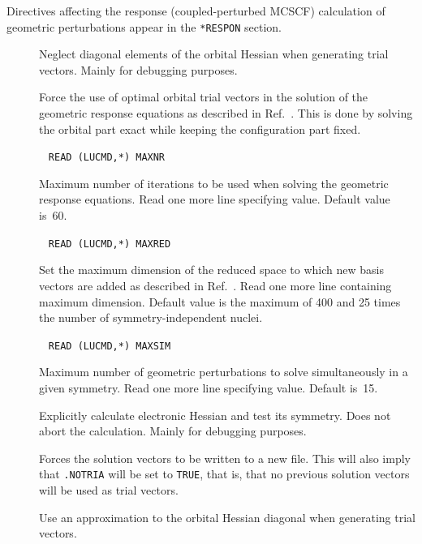 Directives affecting the response (coupled-perturbed MCSCF)
calculation  of geometric perturbations appear in the \verb|*RESPON|
section. 
\begin{description}
\item[] Neglect diagonal elements of the orbital
Hessian when generating trial vectors. Mainly for debugging
purposes. 

\item[] Force the use of optimal orbital
trial vectors in 
the solution of the geometric response equations as described in
Ref.~\cite{tuhjahjajpjjcp84}. This is done by solving the orbital part
exact while keeping the configuration part fixed.

\item[]\verb| |\newline
\verb|READ (LUCMD,*) MAXNR|

Maximum number of iterations to be used when solving the geometric
response equations.  Read one more line specifying value.
Default value is~60.

\item[]\verb| |\newline
\verb|READ (LUCMD,*) MAXRED|

Set the maximum dimension of the reduced space to which new basis
vectors are added as described in Ref.~\cite{tuhjahjajpjjcp84}. Read
one more line containing maximum dimension. Default value is the
maximum of 400 and 25 times the number of symmetry-independent nuclei.

\item[]\verb| |\newline
\verb|READ (LUCMD,*) MAXSIM|

Maximum number of geometric perturbations to solve simultaneously in a
given symmetry.  Read one more line specifying value.  Default
is~15.

\item[] Explicitly calculate electronic Hessian and
test its symmetry. Does not abort the calculation. Mainly for
debugging purposes.

\item[] Forces the solution vectors to be written to a
new file. This will also imply that \verb|.NOTRIA| will be set to
\verb|TRUE|, that is, that no previous solution vectors will be used
as trial vectors.

\item[] Use an approximation to the orbital Hessian
diagonal when generating trial vectors.


\end{description}
